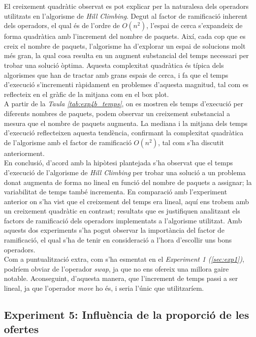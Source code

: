 \documentclass[a4paper]{article}
\begin{document}
	El creixement quadràtic observat es pot explicar per la naturalesa dels operadors utilitzats en l'algorisme de \textit{Hill Climbing}. Degut al factor de ramificació inherent dels operadors, el qual és de l'ordre de $O(n^2)$, l'espai de cerca s'expandeix de forma quadràtica amb l'increment del nombre de paquets. Així, cada cop que es creix el nombre de paquets, l'algorisme ha d'explorar un espai de solucions molt més gran, la qual cosa resulta en un augment substancial del temps necessari per trobar una solució òptima. Aquesta complexitat quadràtica és típica dels algorismes que han de tractar amb grans espais de cerca, i fa que el temps d'execució s'incrementi ràpidament en problemes d'aquesta magnitud, tal com es reflecteix en el gràfic de la mitjana com en el box plot. \\
	
	A partir de la \textit{Taula \ref{tab:exp4b_temps}}, on es mostren els temps d'execució per diferents nombres de paquets, podem observar un creixement substancial a mesura que el nombre de paquets augmenta. La mediana i la mitjana dels temps d'execució reflecteixen aquesta tendència, confirmant la complexitat quadràtica de l'algorisme amb el factor de ramificació $O(n^2)$, tal com s'ha discutit anteriorment. \\
	
	En conclusió, d'acord amb la hipòtesi plantejada s'ha observat que el temps d'execució de l'algorisme de \textit{Hill Climbing} per trobar una solució a un problema donat augmenta de forma no lineal en funció del nombre de paquets a assignar; la variabilitat de temps també incrementa. En comparació amb l'experiment anterior on s'ha vist que el creixement del temps era lineal, aquí ens trobem amb un creixement quadràtic en contrast; resultats que es justifiquen analitzant els factors de ramificació dels operadors implementats a l'algorisme utilitzat. Amb aquests dos experiments s'ha pogut observar la importància del factor de ramificació, el qual s'ha de tenir en consideració a l'hora d'escollir uns bons operadors. \\
	
	Com a puntualització extra, com s'ha esmentat en el \textit{Experiment 1 (\ref{sec:exp1})}, podríem obviar de l'operador \textit{swap}, ja que no ens ofereix una millora gaire notable. Aconseguint, d'aquesta manera, que l'increment de temps passi a ser lineal, ja que l'operador \textit{move} ho és, i seria l'únic que utilitzaríem. \\
	
	
	\subsection{Experiment 5: Influència de la proporció de les ofertes}
	
\end{document}
